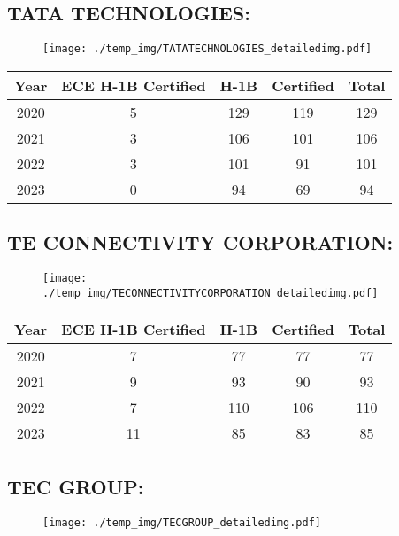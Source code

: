 \documentclass{article}%
\begin{document}
%
\newpage%
\subsection{TATA TECHNOLOGIES:}%
\label{subsec:TATATECHNOLOGIES}%
\label{TATATECHNOLOGIESdetailed}%


\begin{figure}[htbp]%
\centering%
\texttt{[image: ./temp\_img/TATATECHNOLOGIES\_detailedimg.pdf]}%
\end{figure}

%
\begin{longtable}{c|c|c|c|c}%
\hline%
Year&ECE H{-}1B Certified&H{-}1B&Certified&Total\\%
\hline%
2020&5&129&119&129\\%
\hline%
2021&3&106&101&106\\%
\hline%
2022&3&101&91&101\\%
\hline%
2023&0&94&69&94\\%
\hline%
\end{longtable}

%
\newpage%
\subsection{TE CONNECTIVITY CORPORATION:}%
\label{subsec:TECONNECTIVITYCORPORATION}%
\label{TECONNECTIVITYCORPORATIONdetailed}%


\begin{figure}[htbp]%
\centering%
\texttt{[image: ./temp\_img/TECONNECTIVITYCORPORATION\_detailedimg.pdf]}%
\end{figure}

%
\begin{longtable}{c|c|c|c|c}%
\hline%
Year&ECE H{-}1B Certified&H{-}1B&Certified&Total\\%
\hline%
2020&7&77&77&77\\%
\hline%
2021&9&93&90&93\\%
\hline%
2022&7&110&106&110\\%
\hline%
2023&11&85&83&85\\%
\hline%
\end{longtable}

%
\newpage%
\subsection{TEC GROUP:}%
\label{subsec:TECGROUP}%
\label{TECGROUPdetailed}%


\begin{figure}[htbp]%
\centering%
\texttt{[image: ./temp\_img/TECGROUP\_detailedimg.pdf]}%
\end{figure}
\end{document}
